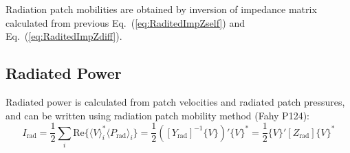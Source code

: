 \documentclass[a4paper,UTF8]{ctexart}
\begin{document}
	Radiation patch mobilities are obtained by inversion of impedance matrix calculated from previous Eq.~(\ref{eq:RaditedImpZself}) and Eq.~(\ref{eq:RaditedImpZdiff}).
	
	
	\subsection{Radiated Power}
	
	Radiated power is calculated from patch velocities and radiated patch pressures, and can be written using radiation patch mobility method (Fahy P124):
	\begin{equation}
	\label{eq:radiated_Power}
	I_{\text{rad}} 
		= \frac 12 \sum_i \mathrm{Re}\{\langle V \rangle_i^\ast 
			\langle P_{\text{rad}} \rangle_i \}
		= \frac 12 \left( \left[ Y_{\text{rad}} \right]^{-1} \{V\} \right)' \{V\}^\ast
		= \frac 12 \{V\}' \left[ Z_{\text{rad}} \right] \{V\}^\ast
	\end{equation}
\end{document}
